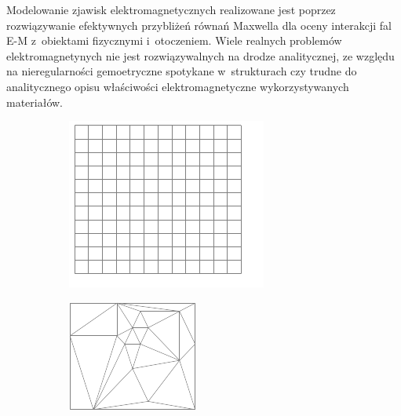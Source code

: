 Modelowanie zjawisk elektromagnetycznych realizowane jest poprzez rozwiązywanie efektywnych przybliżeń równań Maxwella dla oceny interakcji fal E-M z~obiektami fizycznymi i~otoczeniem. Wiele realnych problemów elektromagnetynych nie jest rozwiązywalnych na drodze analitycznej, ze względu na nieregularności gemoetryczne spotykane w~strukturach czy trudne do analitycznego opisu właściwości elektromagnetyczne wykorzystywanych materiałów.


\begin{figure}[tb]
	\centering
	\begin{subfigure}{0.45\textwidth}
		\includegraphics[width=\textwidth]{images/wstep/fdtd.png}
		\caption{}
		\label{fig:wstep-fdtd-dic}
	\end{subfigure}
	\begin{subfigure}{0.45\textwidth}
		\includegraphics[width=\textwidth]{images/wstep/fem.png}
		\caption{}
		\label{fig:wstep-fem-dic}
		

\end{subfigure}
\end{figure}
